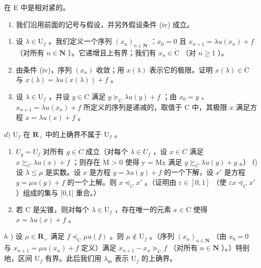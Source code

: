 在 E 中是相对紧的。

\begin{enumerate}
\def\labelenumi{\arabic{enumi})}
\setcounter{enumi}{25}
\tightlist
\item
  我们沿用前面的记号与假设，并另外假设条件 (iv) 成立。
\end{enumerate}

\begin{enumerate}
\def\labelenumi{\alph{enumi})}
\item
  设 \(\lambda \in \mathrm{U}_f\) 。我们定义一个序列 \((x_n)_{n \in \mathbf{N}}\) ：\(x_0 = 0\) 且 \(x_{n+1} = \lambda u(x_n) + f\) （对所有 \(n \in \mathbf{N}\) ）。它递增且上有界；我们有 \(x_n \in \mathring{\mathrm{C}}\) （对 \(n \geqslant 1\) ）。
\item
  由条件 (iv)，序列 \((x_{n})\) 收敛；用 \(x(\lambda)\) 表示它的极限。证明 \(x(\lambda) \in \mathring{\mathrm{C}}\) 与 \(x(\lambda) = \lambda u(x(\lambda)) + f\) 。
\item
  设 \(\lambda \in \mathrm{U}_f\) ，并设 \(y \in \mathrm{C}\) 满足 \(y \succcurlyeq_{\mathrm{C}} \lambda u(y) + f\) ；由 \(x_0 = y\) 、\(x_{n+1} = \lambda u(x_n) + f\) 所定义的序列是递减的，取值于 C 中，其极限 \(x\) 满足方程 \(x = \lambda u(x) + f\) 。
\end{enumerate}

\(d)\) \(\mathrm{U}_{f}\) 在 \(\mathbf{R}_{+}\) 中的上确界不属于 \(\mathrm{U}_{f}\) 。

\begin{enumerate}
\def\labelenumi{\alph{enumi})}
\setcounter{enumi}{4}
\item
  \(U_{g} = U_{f}\) 对所有 \(g \in \mathring{C}\) 成立（对每个 \(\lambda \in U_{f}\) ，设 \(x \in C\) 满足 \(x \succsim_{C} \lambda u(x) + f\) ；则存在 M \textgreater{} 0 使得 y = Mx 满足 \(y \succsim_{C} \lambda u(y) + g\) 。） f) 设 \(\lambda \leqslant \mu\) 是实数。设 \(x\) 是方程 \(y = \lambda u(y) + f\) 的一个下解，设 \(x'\) 是方程 \(y = \mu u(y) + f\) 的一个上解。则 \(x \preccurlyeq_{C} x'\) 。（证明由 \(\varepsilon \in [0,1]\) （使 \(\varepsilon x \preccurlyeq_{C} x'\) ）组成的集与 {[}0,1{]} 重合。）
\item
  若 C 是尖锥，则对每个 \(\lambda \in \mathrm{U}_f\) ，存在唯一的元素 \(x \in \mathring{\mathrm{C}}\) 使得 \(x = \lambda u(x) + f\) 。
\end{enumerate}

\(h\) ) 设 \(\mu\in\mathbf{R}_{+}\) 满足 \(f\preccurlyeq_{\mathrm{C}}\mu u(f)\) 。则 \(\mu\notin\mathrm{U}_{f}\) 。（序列 \((x_{n})_{n\in\mathbf{N}}\) （由 \(x_{0}=0\) 与 \(x_{n+1}=\mu u(x_{n})+f\) 定义）满足 \(x_{n+1}-x_{n}\succcurlyeq_{\mathrm{C}}f\) （对所有 \(n\in\mathbf{N}\) ）。）特别地，区间 \(\mathrm{U}_{f}\) 有界。此后我们用 \(\lambda_{\mathrm{m}}\) 表示 \(\mathrm{U}_{f}\) 的上确界。

